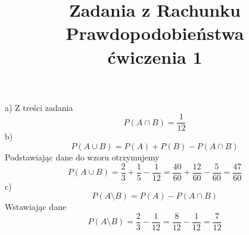 \documentclass[12pt]{article}
\begin{document}
\title{Zadania z Rachunku Prawdopodobieństwa \\ ćwiczenia 1}
\date{}
\maketitle

\medskip
{} 


a) Z treści zadania 
$$P({A}\cap{B})=\frac{1}{12}$$
b)$$P({A}\cup{B})=P(A)+P(B)-P({A}\cap{B})$$
Podstawiając dane do wzoru otrzymujemy
$$P({A}\cup{B})=\frac{2}{3}+\frac{1}{5}-\frac{1}{12}=\frac{40}{60}+\frac{12}{60}-\frac{5}{60}=\frac{47}{60}$$
c)$$P({A}\setminus{B})=P(A)-P({A}\cap{B})$$
Wstawiając dane
$$P({A}\setminus{B})=\frac{2}{3}-\frac{1}{12}=\frac{8}{12}-\frac{1}{12}=\frac{7}{12}$$
\end{document}
